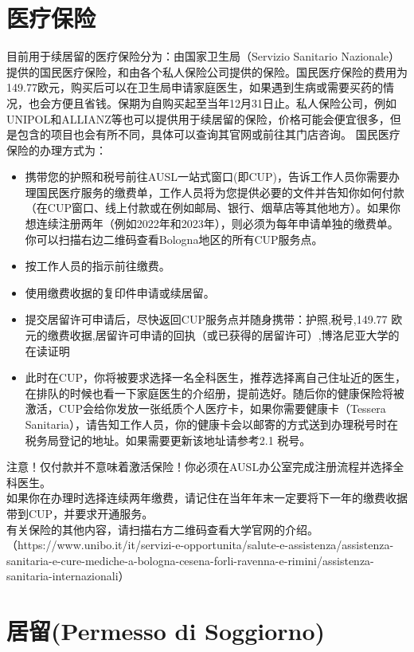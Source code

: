 \section{医疗保险}
目前用于续居留的医疗保险分为：由国家卫生局（Servizio Sanitario Nazionale）提供的国民医疗保险，和由各个私人保险公司提供的保险。国民医疗保险的费用为149.77欧元，购买后可以在卫生局申请家庭医生，如果遇到生病或需要买药的情况，也会方便且省钱。保期为自购买起至当年12月31日止。私人保险公司，例如UNIPOL和ALLIANZ等也可以提供用于续居留的保险，价格可能会便宜很多，但是包含的项目也会有所不同，具体可以查询其官网或前往其门店咨询。
国民医疗保险的办理方式为：
\begin{itemize}
\item 携带您的护照和税号前往AUSL一站式窗口(即CUP)，告诉工作人员你需要办理国民医疗服务的缴费单，工作人员将为您提供必要的文件并告知你如何付款（在CUP窗口、线上付款或在例如邮局、银行、烟草店等其他地方）。如果你想连续注册两年（例如2022年和2023年），则必须为每年申请单独的缴费单。你可以扫描右边二维码查看Bologna地区的所有CUP服务点。%
\item 按工作人员的指示前往缴费。
\item 使用缴费收据的复印件申请或续居留。
\item 提交居留许可申请后，尽快返回CUP服务点并随身携带：护照,税号,149.77 欧元的缴费收据,居留许可申请的回执（或已获得的居留许可）,博洛尼亚大学的在读证明
\item 此时在CUP，你将被要求选择一名全科医生，推荐选择离自己住址近的医生，在排队的时候也看一下家庭医生的介绍册，提前选好。随后你的健康保险将被激活，CUP会给你发放一张纸质个人医疗卡，如果你需要健康卡（Tessera Sanitaria），请告知工作人员，你的健康卡会以邮寄的方式送到办理税号时在税务局登记的地址。如果需要更新该地址请参考2.1 税号。
\end{itemize}
注意！仅付款并不意味着激活保险！你必须在AUSL办公室完成注册流程并选择全科医生。\\
如果你在办理时选择连续两年缴费，请记住在当年年末一定要将下一年的缴费收据带到CUP，并要求开通服务。\\
有关保险的其他内容，请扫描右方二维码查看大学官网的介绍。（https://www.unibo.it/it/servizi-e-opportunita/salute-e-assistenza/assistenza-sanitaria-e-cure-mediche-a-bologna-cesena-forli-ravenna-e-rimini/assistenza-sanitaria-internazionali）

\section{居留(Permesso di Soggiorno)}
